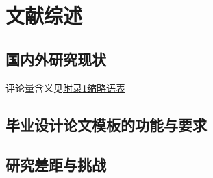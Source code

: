 \documentclass[../main.tex]{subfiles}
\begin{document}
\chapter{文献综述}

\section{国内外研究现状}

评论量含义见\hyperlink{appendix:abbr}{附录1\quad 缩略语表}

\section{毕业设计论文模板的功能与要求}

\section{研究差距与挑战}
\end{document}
